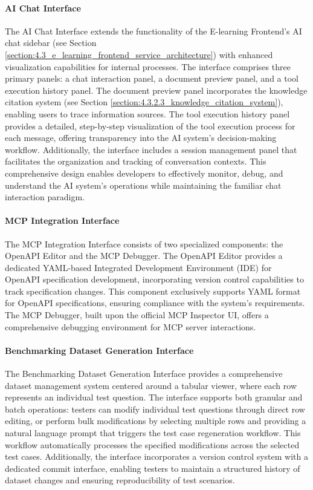 \documentclass[../Main.tex]{subfiles}
\begin{document}
{{	\paragraph{AI Chat Interface} The AI Chat Interface extends the functionality of the E-learning Frontend's AI chat sidebar (see Section \ref{section:4.3_e_learning_frontend_service_architecture}) with enhanced visualization capabilities for internal processes. The interface comprises three primary panels: a chat interaction panel, a document preview panel, and a tool execution history panel. The document preview panel incorporates the knowledge citation system (see Section \ref{section:4.3.2.3_knowledge_citation_system}), enabling users to trace information sources. The tool execution history panel provides a detailed, step-by-step visualization of the tool execution process for each message, offering transparency into the AI system's decision-making workflow. Additionally, the interface includes a session management panel that facilitates the organization and tracking of conversation contexts. This comprehensive design enables developers to effectively monitor, debug, and understand the AI system's operations while maintaining the familiar chat interaction paradigm.
	\paragraph{MCP Integration Interface} The MCP Integration Interface consists of two specialized components: the OpenAPI Editor and the MCP Debugger. The OpenAPI Editor provides a dedicated YAML-based Integrated Development Environment (IDE) for OpenAPI specification development, incorporating version control capabilities to track specification changes. This component exclusively supports YAML format for OpenAPI specifications, ensuring compliance with the system's requirements. The MCP Debugger, built upon the official MCP Inspector UI, offers a comprehensive debugging environment for MCP server interactions.
	\paragraph{Benchmarking Dataset Generation Interface} The Benchmarking Dataset Generation Interface provides a comprehensive dataset management system centered around a tabular viewer, where each row represents an individual test question. The interface supports both granular and batch operations: testers can modify individual test questions through direct row editing, or perform bulk modifications by selecting multiple rows and providing a natural language prompt that triggers the test case regeneration workflow. This workflow automatically processes the specified modifications across the selected test cases. Additionally, the interface incorporates a version control system with a dedicated commit interface, enabling testers to maintain a structured history of dataset changes and ensuring reproducibility of test scenarios.


}}
\end{document}
